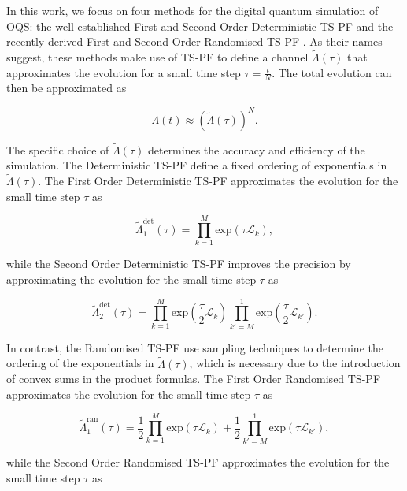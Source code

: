 \documentclass[pdflatex,sn-mathphys-num]{sn-jnl}%
\begin{document}
In this work, we focus on four methods for the digital quantum simulation of OQS: the well-established First and Second Order Deterministic TS-PF and the recently derived First and Second Order Randomised TS-PF \cite{childs2019faster,david2024faster}. As their names suggest, these methods make use of TS-PF to define a channel $\tilde{\Lambda}(\tau)$ that approximates the evolution for a small time step $\tau = \frac{t}{N}$. The total evolution can then be approximated as 

\begin{equation}
\Lambda(t) \approx (\tilde{\Lambda}(\tau))^N. 
\end{equation}

\noindent The specific choice of $\tilde{\Lambda}(\tau)$ determines the accuracy and efficiency of the simulation. The Deterministic TS-PF define a fixed ordering of exponentials in $\tilde{\Lambda}(\tau)$. The First Order Deterministic TS-PF approximates the evolution for the small time step $\tau$ as 

\begin{equation}
\tilde{\Lambda}_1^{\mathrm{det}}(\tau) = \prod_{k=1}^M \mathrm{exp}(\tau\mathcal{L}_k),      
\end{equation}

\noindent while the Second Order Deterministic TS-PF improves the precision by approximating the evolution for the small time step $\tau$ as  

\begin{equation}
\tilde{\Lambda}_2^{\mathrm{det}}(\tau) = \prod_{k=1}^M \mathrm{exp}(\frac{\tau}{2}\mathcal{L}_k) \prod_{k'=M}^1 \mathrm{exp}(\frac{\tau}{2}\mathcal{L}_{k'}).     
\end{equation}

In contrast, the Randomised TS-PF use sampling techniques to determine the ordering of the exponentials in $\tilde{\Lambda}(\tau)$, which is necessary due to the introduction of convex sums in the product formulas. The First Order Randomised TS-PF approximates the evolution for the small time step $\tau$ as

\begin{equation}
\tilde{\Lambda}_1^{\mathrm{ran}}(\tau) = \frac{1}{2} \prod_{k=1}^M \mathrm{exp}(\tau\mathcal{L}_k) + \frac{1}{2} \prod_{k'=M}^1 \mathrm{exp}(\tau\mathcal{L}_{k'}),
\end{equation}

\noindent while the Second Order Randomised TS-PF approximates the evolution for the small time step $\tau$ as  
\end{document}
